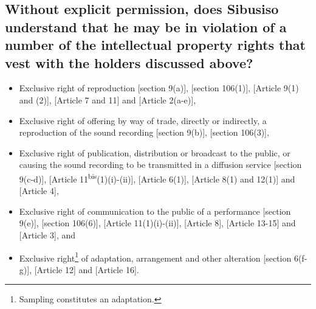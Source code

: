 \documentclass[11pt]{article}
\begin{document}
\subsection{Without explicit permission, does Sibusiso understand that he may be in violation of a number of the intellectual property rights that vest with the holders discussed above?}
\label{sec:org887eb84}
\begin{itemize}
\item Exclusive right of reproduction [section 9(a)]\cite{rsa78_copyrightact},
[section 106(1)]\cite{usa76_title17_us_copyright_act}, [Article 9(1) and
(2)]\cite{wipo86_berne}, [Article 7 and 11]\cite{wipo96_wppt} and [Article
2(a-e)]\cite{eurlex01_harmonisation},
\item Exclusive right of offering by way of trade, directly or indirectly, a
reproduction of the sound recording [section 9(b)]\cite{rsa78_copyrightact}, [section 106(3)]\cite{usa76_title17_us_copyright_act},
\item Exclusive right of publication, distribution or broadcast to the public, or
causing the sound recording to be transmitted in a diffusion service [section
9(c-d)]\cite{rsa78_copyrightact}, [Article
11\textsuperscript{bis}(1)(i)-(ii)]\cite{wipo86_berne}, [Article
6(1)]\cite{wipo96_copyright_treaty}, [Article 8(1) and 12(1)]\cite{wipo96_wppt}
and [Article 4]\cite{eurlex01_harmonisation},
\item Exclusive right of communication to the public of a performance [section
9(e)]\cite{rsa78_copyrightact}, [section
106(6)]\cite{usa76_title17_us_copyright_act}, [Article
11(1)(i)-(ii)]\cite{wipo86_berne}, [Article 8]\cite{wipo96_copyright_treaty},
[Article 13-15]\cite{wipo96_wppt} and [Article 3]\cite{eurlex01_harmonisation},
and
\item Exclusive right\footnote{Sampling constitutes an adaptation.} of adaptation,
arrangement and other alteration [section 6(f-g)]\cite{rsa78_copyrightact},
[Article 12]\cite{wipo86_berne} and [Article 16]\cite{wipo96_wppt}.
\end{itemize}
\end{document}
